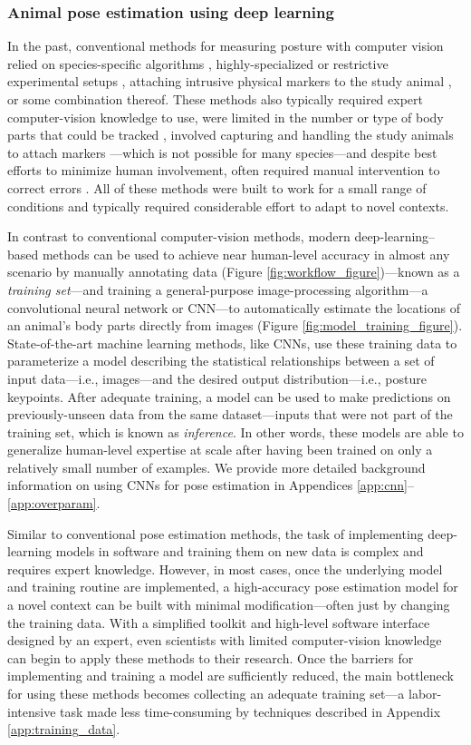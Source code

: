 \documentclass[11pt,a4paper,oneside]{article}
\begin{document}
\subsubsection{Animal pose estimation using deep learning}
In the past, conventional methods for measuring posture with computer vision relied on species-specific algorithms \citep{uhlmann2017flylimbtracker}, highly-specialized or restrictive experimental setups \citep{mendes2013quantification, kain2013leg}, attaching intrusive physical markers to the study animal \citep{kain2013leg}, or some combination thereof. These methods also typically required expert computer-vision knowledge to use, were limited in the number or type of body parts that could be tracked \citep{mendes2013quantification}, involved capturing and handling the study animals to attach markers \citep{kain2013leg}---which is not possible for many species---and despite best efforts to minimize human involvement, often required manual intervention to correct errors \citep{uhlmann2017flylimbtracker}. All of these methods were built to work for a small range of conditions and typically required considerable effort to adapt to novel contexts.

In contrast to conventional computer-vision methods, modern deep-learning–based methods can be used to achieve near human-level accuracy in almost any scenario by manually annotating data (Figure \ref{fig:workflow_figure})—known as a \textit{training set}—and training a general-purpose image-processing algorithm—a convolutional neural network or CNN—to automatically estimate the locations of an animal's body parts directly from images (Figure \ref{fig:model_training_figure}). State-of-the-art machine learning methods, like CNNs, use these training data to parameterize a model describing the statistical relationships between a set of input data—i.e., images—and the desired output distribution—i.e., posture keypoints. After adequate training, a model can be used to make predictions on previously-unseen data from the same dataset—inputs that were not part of the training set, which is known as \textit{inference}. In other words, these models are able to generalize human-level expertise at scale after having been trained on only a relatively small number of examples. We provide more detailed background information on using CNNs for pose estimation in Appendices \ref{app:cnn}–\ref{app:overparam}.

Similar to conventional pose estimation methods, the task of implementing deep-learning models in software and training them on new data is complex and requires expert knowledge. However, in most cases, once the underlying model and training routine are implemented, a high-accuracy pose estimation model for a novel context can be built with minimal modification—often just by changing the training data. With a simplified toolkit and high-level software interface designed by an expert, even scientists with limited computer-vision knowledge can begin to apply these methods to their research. Once the barriers for implementing and training a model are sufficiently reduced, the main bottleneck for using these methods becomes collecting an adequate training set—a labor-intensive task made less time-consuming by techniques described in Appendix \ref{app:training_data}.
\end{document}
